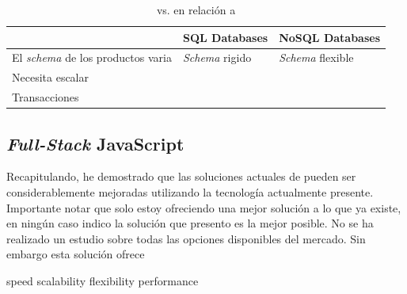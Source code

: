 \begin{table}[h!]
    \tiny
   
\begin{tabular}{ |L{0.1\paperwidth}|L{0.3\paperwidth}|L{0.3\paperwidth}|}
\hline
	\ecommerce&
	SQL Databases &
	NoSQL Databases
 
\\ \hline
	El \textit{schema} de los productos varia&
	\textit{Schema} rigido&
	\textit{Schema} flexible
\\ \hline
	Necesita escalar&
	&
	
\\ \hline
	Transacciones&
	&
	
\\ \hline
\end{tabular}
    \caption{ \nosql vs. \sql en relación a \ecommerce}
    \label{tab:SQL_vs_noSQL_summary}
\end{table}

	\subsection{ \textit{Full-Stack} JavaScript }
	



Recapitulando, he demostrado que las soluciones actuales de \ecommerce pueden ser considerablemente mejoradas utilizando la tecnología actualmente presente. 
Importante notar que solo estoy ofreciendo una mejor solución a lo que ya existe, en ningún caso indico la solución que presento es la mejor posible. No se ha realizado un estudio sobre todas las opciones disponibles del mercado. Sin embargo esta solución ofrece

speed
scalability
flexibility
performance
